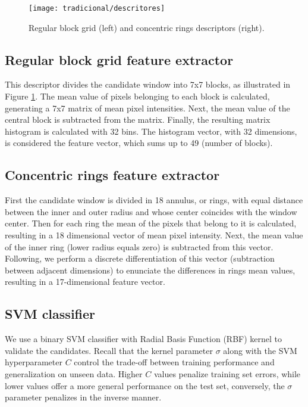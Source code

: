     \begin{figure}
    \centering
    \texttt{[image: tradicional/descritores]}
    \caption{Regular block grid (left) and concentric rings descriptors (right).}
    \label{fig:descriptors}
    \end{figure}

    \subsection{Regular block grid feature extractor}
      This descriptor divides the candidate window into 7x7 blocks, as illustrated in Figure \ref{fig:descriptors}. The mean value of pixels belonging to each block is calculated, generating a 7x7 matrix of mean pixel intensities. Next, the mean value of the central block is subtracted from the matrix. Finally, the resulting matrix histogram is calculated with 32 bins. The histogram vector, with 32 dimensions, is considered the feature vector, which sums up to 49 (number of blocks).

    \subsection{Concentric rings feature extractor}
       First the candidate window is divided in 18 annulus, or rings, with equal distance between the inner and outer radius and whose center coincides with the window center. Then for each ring the mean of the pixels that belong to it is calculated, resulting in a 18 dimensional vector of mean pixel intensity. Next, the mean value of the inner ring (lower radius equals zero) is subtracted from this vector. Following, we perform a discrete differentiation of this vector (subtraction between adjacent dimensions) to enunciate the differences in rings mean values, resulting in a 17-dimensional feature vector.

    \subsection{SVM classifier}
      We use a binary SVM classifier with Radial Basis Function (RBF) kernel \cite{rbfkernel} to validate the candidates. Recall that the kernel parameter $\sigma$ along with the SVM hyperparameter $C$ control the trade-off between training performance and generalization on unseen data. Higher $C$ values penalize training set errors, while lower values offer a more general performance on the test set, conversely, the $\sigma$ parameter penalizes in the inverse manner.

